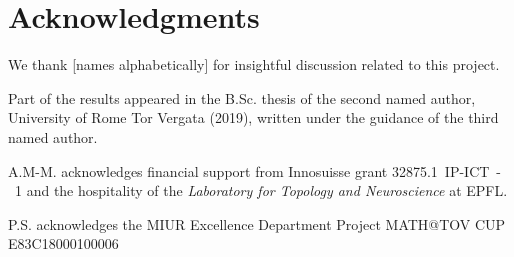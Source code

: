 
\section*{Acknowledgments}

We thank [names alphabetically] for insightful discussion related to this project.

Part of the results appeared in the B.Sc. thesis of the second named author, University of Rome Tor Vergata (2019), written under the guidance of the third named author.

A.M-M. acknowledges financial support from Innosuisse grant 32875.1~IP-ICT~-~1 and the hospitality of the \textit{Laboratory for Topology and Neuroscience} at EPFL.

P.S. acknowledges the MIUR Excellence Department Project MATH@TOV CUP E83C18000100006
